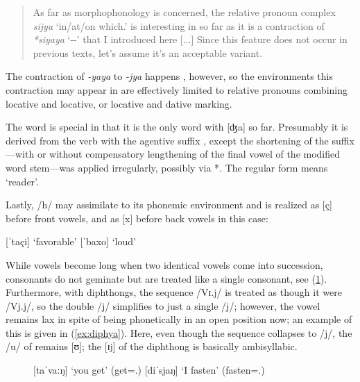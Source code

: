 \blockcquote[12]{becker:kafka:imperial}{As far as morphophonology is concerned,
the relative pronoun complex \textit{sijya} `in/at/on which.\Loc{}' is
interesting in so far as it is a contraction of \textit{*siyaya}
`\Rel{}-\Loc{}-\Loc{}' that I introduced here [...] Since this feature does not
occur in previous texts, let's assume it's an acceptable variant.}

The contraction of \textit{-yaya} to \textit{-jya} happens
, however, so the environments this contraction may appear in are
effectively limited to relative pronouns combining locative and locative, or
locative and dative marking.

The word  is special in that it is the only word
with   [ʤa] so far. Presumably it is derived from the verb
 with the agentive suffix , except the
shortening of the suffix---with or without compensatory lengthening of the
final vowel of the modified word stem---was applied irregularly, possibly via
*. The regular form  means `reader'.

Lastly, /h/ may assimilate to its phonemic environment and is realized as 
[ç] before front vowels, and as [x] before back vowels in this case:

\pex
	\a {} [ˈtaçi] `favorable'
	\a {} [ˈbaxo] `loud'
\xe

While vowels become long when two identical vowels come into succession,
consonants do not geminate but are treated like a single consonant, see
(\ref{ex:geminates}). Furthermore, with diphthongs, the
sequence /Vɪ.j/ is treated as though it were /Vj.j/, so the double /j/
simplifies to just a single /j/; however, the vowel remains lax in spite of
being phonetically in an open position now; an example of this is given in
(\ref{ex:diphya}). Here, even though the  sequence collapses to /j/,
the /u/ of  remains [ʊ]; the [ɪ\til{}j] of the diphthong is
basically ambisyllabic.

\begin{figure}[h]
\pex\label{ex:geminates}
	\a {} [taˈvaːŋ] `you get' 
		(get=\Ssg{}.\Aarg{})
	\a {} [diˈsjaŋ] `I fasten' 
		(fasten=\Fsg{}.\Aarg{})
\xe
\end{figure}


